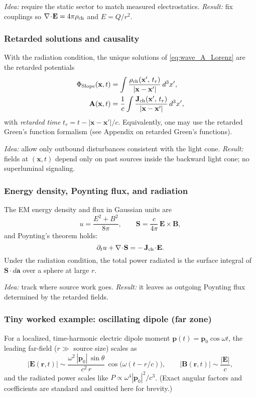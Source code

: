 \noindent\emph{Idea:} require the static sector to match measured electrostatics. \;
\emph{Result:} fix couplings so \(\nabla\!\cdot\!\mathbf E=4\pi\rho_{\rm ch}\) and \(E=Q/r^2\).

\subsubsection{Retarded solutions and causality}
With the radiation condition, the unique solutions of \eqref{eq:wave_A_Lorenz} are the retarded potentials
\begin{align}
\Phi_{\text{Slope}}(\mathbf x,t) &= \int \frac{\rho_{\rm ch}(\mathbf x',\,t_r)}{|\mathbf x-\mathbf x'|}\,d^3x',\\
\mathbf A(\mathbf x,t) &= \frac{1}{c}\int \frac{\mathbf J_{\rm ch}(\mathbf x',\,t_r)}{|\mathbf x-\mathbf x'|}\,d^3x',
\end{align}
with \emph{retarded time} \(t_r=t-|\mathbf x-\mathbf x'|/c\).
Equivalently, one may use the retarded Green's function formalism (see Appendix on retarded Green's functions).

\noindent\emph{Idea:} allow only outbound disturbances consistent with the light cone. \;
\emph{Result:} fields at \((\mathbf x,t)\) depend only on past sources inside the backward light cone; no superluminal signaling.

\subsubsection{Energy density, Poynting flux, and radiation}
The EM energy density and flux in Gaussian units are
\begin{equation}
u = \frac{E^2+B^2}{8\pi}, \qquad \mathbf S = \frac{c}{4\pi}\,\mathbf E\times\mathbf B,
\end{equation}
and Poynting's theorem holds:
\begin{equation}
\partial_t u + \nabla\!\cdot\!\mathbf S = -\,\mathbf J_{\rm ch}\!\cdot\!\mathbf E.
\end{equation}
Under the radiation condition, the total power radiated is the surface integral of \(\mathbf S\cdot d\mathbf a\) over a sphere at large \(r\).

\noindent\emph{Idea:} track where source work goes. \;
\emph{Result:} it leaves as outgoing Poynting flux determined by the retarded fields.

\subsubsection{Tiny worked example: oscillating dipole (far zone)}
For a localized, time-harmonic electric dipole moment \( \mathbf p(t)=\mathbf p_0\cos\omega t\),
the leading far-field (\(r\gg\) source size) scales as
\begin{equation}
\big|\mathbf E(\mathbf r,t)\big| \sim \frac{\omega^2\,|\mathbf p_0|\,\sin\theta}{c^2\,r}\,
\cos\!\big(\omega(t-r/c)\big), \qquad
\big|\mathbf B(\mathbf r,t)\big| \sim \frac{|\mathbf E|}{c},
\end{equation}
and the radiated power scales like \(P \propto \omega^4 |\mathbf p_0|^2/c^3\).
(Exact angular factors and coefficients are standard and omitted here for brevity.)

